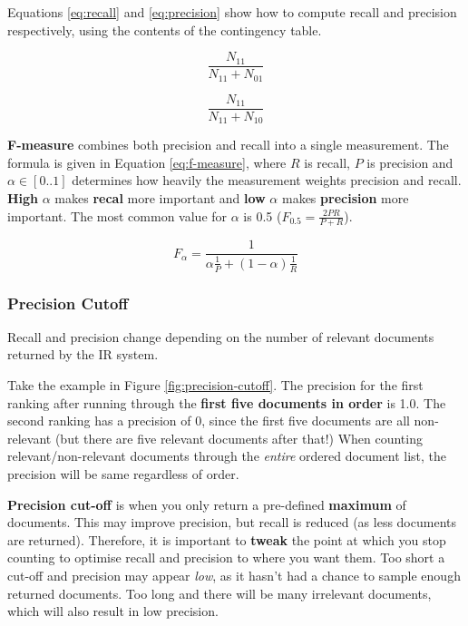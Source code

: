 \documentclass{article}
\begin{document}
Equations \ref{eq:recall} and \ref{eq:precision} show how to compute recall and precision respectively, using the contents of the contingency table.

\begin{equation}
	\frac{N_{11}}{N_{11} + N_{01}}
	\label{eq:recall}
\end{equation}

\begin{equation}
	\frac{N_{11}}{N_{11} + N_{10}}
	\label{eq:precision}
\end{equation}

\textbf{F-measure} combines both precision and recall into a single measurement. The formula is given in Equation \ref{eq:f-measure}, where $R$ is recall, $P$ is precision and $\alpha \in [0..1]$ determines how heavily the measurement weights precision and recall. \textbf{High} $\alpha$ makes \textbf{recal}  more important and \textbf{low} $\alpha$ makes \textbf{precision} more important. The most common value for $\alpha$ is 0.5 ($F_{0.5} = \frac{2PR}{P + R}$).

\begin{equation}
	F_{\alpha} = \frac{1}{\alpha \frac{1}{P} + (1-\alpha)\frac{1}{R}}
	\label{eq:f-measure}
\end{equation}

\subsubsection{Precision Cutoff}

Recall and precision change depending on the number of relevant documents returned by the IR system.

Take the example in Figure \ref{fig:precision-cutoff}. The precision for the first ranking after running through the \textbf{first five documents in order} is 1.0. The second ranking has a precision of 0, since the first five documents are all non-relevant (but there are five relevant documents after that!) When counting relevant/non-relevant documents through the \textit{entire} ordered document list, the precision will be same regardless of order.

\textbf{Precision cut-off} is when you only return a pre-defined \textbf{maximum} of documents. This may improve precision, but recall is reduced (as less documents are returned). Therefore, it is important to \textbf{tweak} the point at which you stop counting to optimise recall and precision to where you want them. Too short a cut-off and precision may appear \textit{low}, as it hasn't had a chance to sample enough returned documents. Too long and there will be many irrelevant documents, which will also result in low precision.
\end{document}
